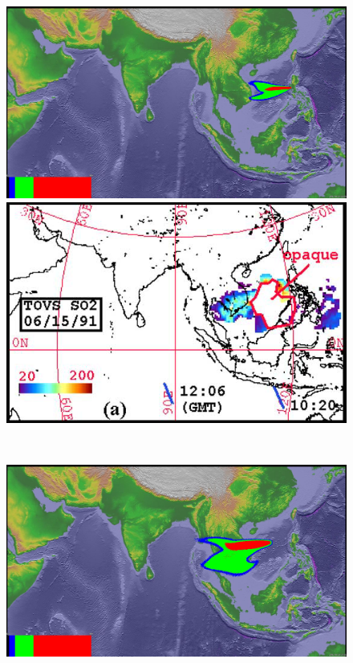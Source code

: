\begin{figure}[!htb]
    \centering
    \begin{minipage}{.325\textwidth}
        \centering
        \includegraphics[width=0.99 \textwidth]{Chapter-7/Figures/SPH-Plume-7p3hr-ash}
    \end{minipage}%
    \begin{minipage}{.325 \textwidth}
        \centering
        \includegraphics[width=0.99 \textwidth]{Chapter-7/Figures/OB-SO2-7p3hr-ash}
    \end{minipage}%
    \\
    \begin{minipage}{.325\textwidth}
        \centering
        \includegraphics[width=0.99 \textwidth]{Chapter-7/Figures/SPH-Plume-23hr-ash}

\end{minipage}
\end{figure}
